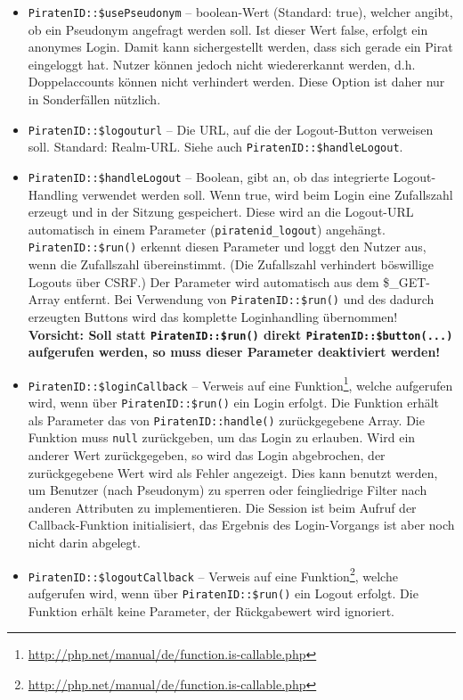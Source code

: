 \begin{itemize}
	\item \texttt{PiratenID::\$usePseudonym} -- boolean-Wert (Standard: true), welcher angibt, ob ein Pseudonym angefragt werden soll.
											Ist dieser Wert false, erfolgt ein anonymes Login.
											Damit kann sichergestellt werden, dass sich gerade ein Pirat eingeloggt hat.
											Nutzer können jedoch nicht wiedererkannt werden, d.h. Doppelaccounts können nicht verhindert werden.
											Diese Option ist daher nur in Sonderfällen nützlich.
	
	\item \texttt{PiratenID::\$logouturl} -- Die URL, auf die der Logout-Button verweisen soll. Standard: Realm-URL.
											Siehe auch \texttt{PiratenID::\$handleLogout}.

	\item \texttt{PiratenID::\$handleLogout} -- Boolean, gibt an, ob das integrierte Logout-Handling verwendet werden soll.
											Wenn true, wird beim Login eine Zufallszahl erzeugt und in der Sitzung gespeichert.
											Diese wird an die Logout-URL automatisch in einem Parameter (\texttt{piratenid\_logout}) angehängt.
											\texttt{PiratenID::\$run()} erkennt diesen Parameter und loggt den Nutzer aus,
											wenn die Zufallszahl übereinstimmt. (Die Zufallszahl verhindert böswillige Logouts über CSRF.)
											Der Parameter wird automatisch aus dem \$\_GET-Array entfernt.
											Bei Verwendung von \texttt{PiratenID::\$run()} und des dadurch erzeugten Buttons
											wird das komplette Loginhandling übernommen!
											\\\textbf{Vorsicht:
												Soll statt \texttt{PiratenID::\$run()} direkt \texttt{PiratenID::\$button(...)} aufgerufen werden,
												so muss dieser Parameter deaktiviert werden! }
												
	\item \texttt{PiratenID::\$loginCallback} -- Verweis auf eine Funktion\footnote{\url{http://php.net/manual/de/function.is-callable.php}},
											welche aufgerufen wird, wenn über \texttt{PiratenID::\$run()} ein Login erfolgt.
											Die Funktion erhält als Parameter das von \texttt{PiratenID::handle()} zurückgegebene Array.
											Die Funktion muss \texttt{null} zurückgeben, um das Login zu erlauben.
											Wird ein anderer Wert zurückgegeben, so wird das Login abgebrochen,
											der zurückgegebene Wert wird als Fehler angezeigt.
											Dies kann benutzt werden, um Benutzer (nach Pseudonym) zu sperren oder
											feingliedrige Filter nach anderen Attributen zu implementieren.
											Die Session ist beim Aufruf der Callback-Funktion initialisiert,
											das Ergebnis des Login-Vorgangs ist aber noch nicht darin abgelegt.
	
	\item \texttt{PiratenID::\$logoutCallback} -- Verweis auf eine Funktion\footnote{\url{http://php.net/manual/de/function.is-callable.php}},
											welche aufgerufen wird, wenn über \texttt{PiratenID::\$run()} ein Logout erfolgt.
											Die Funktion erhält keine Parameter, der Rückgabewert wird ignoriert.

\end{itemize}

